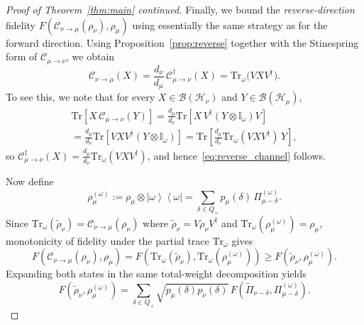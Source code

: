 \documentclass[a4paper,onecolumn,11pt]{quantumarticle}
\newcommand{\ketbra}[2]{\left|#1\right\rangle\!\!\left\langle #2\right|}
\def\id{\mathbb{I}}
\newcommand*{\Tr}{\mathrm{Tr}}
\def\C{\mathcal{C}}
\begin{document}
\begin{proof}[Proof of Theorem~\ref{thm:main} continued]
Finally, we bound the \emph{reverse-direction} fidelity
\(F(\C_{\nu\to\mu}(\rho_\nu),\rho_\mu)\) using essentially the same strategy as for the forward direction.
Using Proposition~\ref{prop:reverse} together with the Stinespring form of \(\C_{\mu\to\nu}\), we obtain
\begin{equation}\label{eq:reverse_channel}
    \C_{\nu\to\mu}(X) =
    \frac{d_\nu}{d_\mu}\,\C_{\mu\to\nu}^{\dagger}(X) =
    \Tr_\omega\!\bigl(V X V^\dagger\bigr).
\end{equation}
To see this, we note that for every \(X\in \mathcal B(\mathcal H_\nu)\) and \(Y\in \mathcal B(\mathcal H_\mu)\),
\begin{multline}
    \Tr\!\left[X\,\C_{\mu\to\nu}(Y)\right]
    =\frac{d_\mu}{d_\nu}\Tr\!\left[X\,V^\dagger(Y\otimes \id_\omega)V\right] 
    \\
    =\frac{d_\mu}{d_\nu}\Tr\!\left[VXV^\dagger (Y\otimes \id_\omega)\right] 
    =\Tr\!\left[
        \frac{d_\mu}{d_\nu}\Tr_\omega(VXV^\dagger)\,Y
    \right],
\end{multline}
so \(\C_{\mu\to\nu}^{\dagger}(X)=\frac{d_\mu}{d_\nu}\Tr_\omega(VXV^\dagger)\), and hence~\eqref{eq:reverse_channel} follows.

Now define
\begin{equation}
    \rho_\mu^{(\omega)}
    :=
    \rho_\mu\otimes \ketbra{\omega}{\omega}
    =
    \sum_{\delta\in Q_+} p_\mu(\delta)\,\Pi_{\mu-\delta}^{(\omega)}.
\end{equation}
Since \(\Tr_\omega(\widetilde{\rho}_\nu)=\C_{\nu\to\mu}(\rho_\nu)\) where $\widetilde{\rho}_\nu=V\rho_\nu V^\dagger$ and
\(\Tr_\omega(\rho_\mu^{(\omega)})=\rho_\mu\), monotonicity of fidelity under the partial trace
\(\Tr_\omega\) gives
\begin{equation}\label{eq:reverse_reduce}
    F(\C_{\nu\to\mu}(\rho_\nu),\rho_\mu)
    =
    F\!\left(\Tr_\omega(\widetilde{\rho}_\nu),\Tr_\omega(\rho_\mu^{(\omega)})\right)
    \ge
    F(\widetilde{\rho}_\nu,\rho_\mu^{(\omega)}).
\end{equation}
Expanding both states in the same total-weight decomposition yields
\begin{equation}\label{eq:reverse_blocks}
    F(\widetilde{\rho}_\nu,\rho_\mu^{(\omega)})
    =
    \sum_{\delta\in Q_+}
    \sqrt{p_\mu(\delta)p_\nu(\delta)}\,
    F(\widetilde{\Pi}_{\nu-\delta},\Pi_{\mu-\delta}^{(\omega)}).
\end{equation}


\end{proof}
\end{document}
